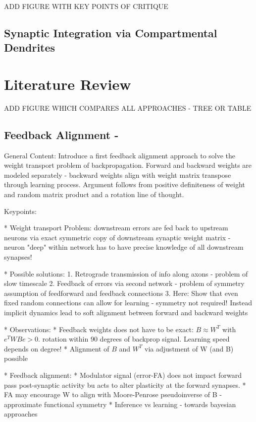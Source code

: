 \documentclass{article}
\theoremstyle{definition}
\begin{document}
ADD FIGURE WITH KEY POINTS OF CRITIQUE

\subsection*{Synaptic Integration via Compartmental Dendrites}


\newpage
\section{Literature Review}

ADD FIGURE WHICH COMPARES ALL APPROACHES - TREE OR TABLE

\subsection*{Feedback Alignment - \citet{lillicrap2016}}

General Content: Introduce a first feedback alignment approach to solve the weight transport problem of backpropagation. Forward and backward weights are modeled separately - backward weights align with weight matrix transpose through learning process. Argument follows from positive definiteness of weight and random matrix product and a rotation line of thought.


Keypoints:

* Weight transport Problem: downstream errors are fed back to upstream neurons via exact symmetric copy of downstream synaptic weight matrix - neuron "deep" within network has to have precise knowledge of all downstream synapses!

* Possible solutions:
    1. Retrograde transmission of info along axons - problem of slow timescale
    2. Feedback of errors via second network - problem of symmetry assumption of feedforward and feedback connections
    3. Here: Show that even fixed random connections can allow for learning - symmetry not required! Instead implicit dynamics lead to soft alignment between forward and backward weights

* Observations:
    * Feedback weights does not have to be exact: $B \approx W^T$ with $e^TWBe > 0$. rotation within 90 degrees of backprop signal. Learning speed depends on degree!
    * Alignment of $B$ and $W^T$ via adjustment of W (and B) possible

* Feedback alignment:
    * Modulator signal (error-FA) does not impact forward pass post-synaptic activity bu acts to alter plasticity at the forward synapses.
    * FA may encourage W to align with Moore-Penrose pseudoinverse of B - approximate functional symmetry
    * Inference vs learning - towards bayesian approaches
\end{document}
